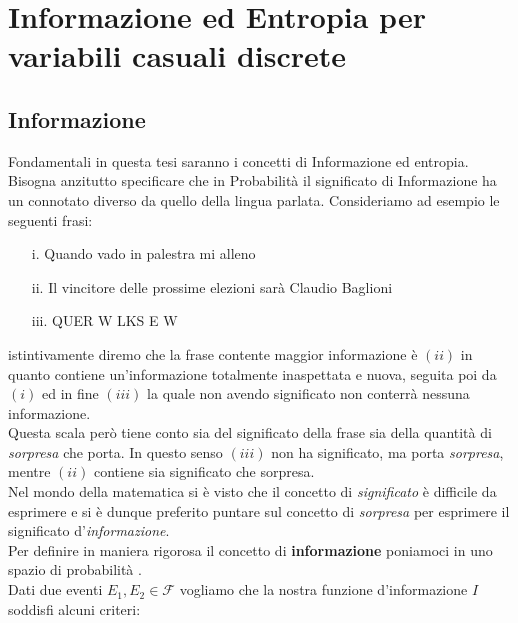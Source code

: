 \chapter{Informazione ed Entropia per variabili casuali discrete}
\label{cha:intro}




\section{Informazione}
\label{sec:informazione}
Fondamentali in questa tesi saranno i concetti di Informazione ed entropia.\\
Bisogna anzitutto specificare che in Probabilità il significato di Informazione ha un connotato diverso da quello della lingua parlata. Consideriamo ad esempio le seguenti frasi: 
\begin{enumerate}
\item[i.] Quando vado in palestra mi alleno
\item[ii.] Il vincitore delle prossime elezioni sarà Claudio Baglioni
\item[iii.] QUER W LKS E W
\end{enumerate}

istintivamente diremo che la frase contente maggior informazione è $(ii)$ in quanto contiene un'informazione totalmente inaspettata e nuova, seguita poi da $(i)$ ed in fine $(iii)$ la quale non avendo significato non conterrà nessuna informazione.\\ Questa scala però tiene conto sia del significato della frase sia della quantità di \textit{sorpresa} che porta. In questo senso $(iii)$ non ha significato, ma porta \textit{sorpresa}, mentre $(ii)$ contiene sia significato che sorpresa.\\ Nel mondo della matematica si è visto che il concetto di \textit{significato} è difficile da esprimere e si è dunque preferito puntare sul concetto di \textit{sorpresa} per esprimere il significato d'\textit{informazione}.\\
Per definire in maniera rigorosa il concetto di \textbf{informazione} poniamoci in uno spazio di probabilità \spacep.\\
Dati due eventi $E_1,E_2 \in \mathcal{F}$ vogliamo che la nostra funzione d'informazione $I$ soddisfi alcuni criteri:

